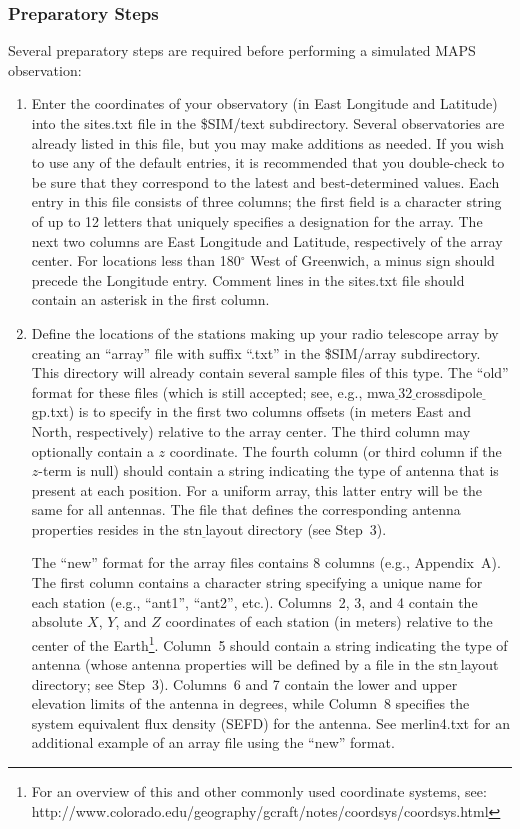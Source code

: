 \documentclass[12pt,psfig]{article}
\begin{document}
\subsubsection{Preparatory Steps}

Several preparatory steps are required before performing a simulated
MAPS 
observation:

\begin{enumerate}

\item
Enter the
coordinates of your observatory (in East Longitude and Latitude) 
into the {\sf sites.txt} file in the {\sf \$SIM/text} 
subdirectory. Several 
observatories are already listed in this file, but you may make
additions as
needed. If you wish to use any of the default entries, it is
recommended that you double-check 
to be sure that they correspond to
the latest and best-determined values. Each entry in this file consists of 
three columns; the first field is a character string of up to 12
letters that uniquely specifies a designation for the array. 
The next two columns are East Longitude
and Latitude, respectively of the array center. 
For locations less than 180$^{\circ}$ West
of Greenwich, a minus sign should precede the Longitude entry. Comment
lines in the {\sf sites.txt} file should contain an asterisk in the
first column. 

\item
Define the locations of the stations making up your radio telescope
array by creating an ``array'' 
file with suffix ``.txt'' in the {\sf \$SIM/array}
subdirectory. This directory will already contain several sample
files of this type. 
The ``old'' format for these files (which is still accepted; see, e.g.,
{\sf mwa$\underline~$32$\underline~$crossdipole$\underline~$gp.txt}) 
is to specify in the first two columns offsets (in
meters East and North, respectively) relative to the array center.
The third column may optionally contain a $z$ coordinate. The fourth column
(or third column if the $z$-term is null) should contain a string
indicating the type of antenna that is present at each
position. For a uniform array, this latter entry will be the same for all
antennas. The file that defines the corresponding antenna properties
resides in the {\sf stn$\underline~$layout} directory (see Step~3).

The ``new''  format for the array files contains 8
columns (e.g., Appendix~A). 
The first column contains a character string specifying a
unique name for each station (e.g., ``ant1'', ``ant2'',
etc.). Columns~2, 
3, and 4 contain the absolute $X$, $Y$, and $Z$ coordinates of each
station (in meters) relative to the center of the Earth\footnote{For
  an overview of this and other commonly used coordinate systems, see:
  http://www.colorado.edu/geography/gcraft/notes/coordsys/coordsys.html}. 
Column~5
should contain a string indicating the type of antenna (whose antenna
properties will be defined by a file in the {\sf stn$\underline~$layout}
directory; see Step~3). Columns~6 and 7 contain the lower and upper elevation
limits of the antenna in degrees, while Column~8 specifies the system
equivalent flux density (SEFD) for the antenna. See {\sf merlin4.txt}
for an additional example of an array file using the ``new'' format.


\end{enumerate}
\end{document}
